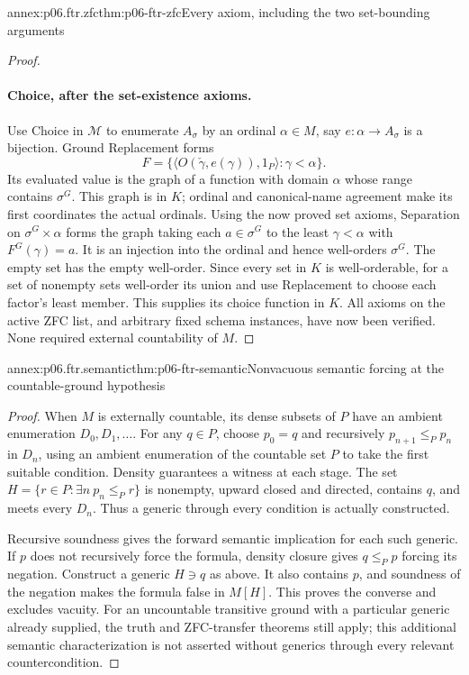 \begin{annexitem}{annex:p06.ftr.zfc}{thm:p06-ftr-zfc}{Every axiom, including the two set-bounding arguments}
\begin{proof}
\paragraph{Choice, after the set-existence axioms.}
Use Choice in \(\mathcal M\) to enumerate \(A_\sigma\) by an ordinal
\(\alpha\in M\), say \(e:\alpha\to A_\sigma\) is a bijection.
Ground Replacement forms
\[
 F=\{\langle O(\check\gamma,e(\gamma)),1_P\rangle:\gamma<\alpha\}.
\]
Its evaluated value is the graph of a function with domain \(\alpha\)
whose range contains \(\sigma^G\). This graph is in \(K\); ordinal
and canonical-name agreement make its first coordinates the actual ordinals.
Using the now proved set axioms, Separation on \(\sigma^G\times\alpha\)
forms the graph taking each \(a\in\sigma^G\) to the least
\(\gamma<\alpha\) with \(F^G(\gamma)=a\). It is an injection into
the ordinal and hence well-orders \(\sigma^G\). The empty set has the
empty well-order. Since every set in \(K\) is well-orderable, for a set
of nonempty sets well-order its union and use Replacement to choose each
factor's least member. This supplies its choice function in \(K\).
All axioms on the active ZFC list, and arbitrary fixed schema instances,
have now been verified. None required external countability of \(M\).
\end{proof}
\end{annexitem}

\begin{annexitem}{annex:p06.ftr.semantic}{thm:p06-ftr-semantic}{Nonvacuous semantic forcing at the countable-ground hypothesis}
\begin{proof}
When \(M\) is externally countable, its dense subsets of \(P\) have
an ambient enumeration \(D_0,D_1,\ldots\). For any \(q\in P\), choose
\(p_0=q\) and recursively \(p_{n+1}\leq_P p_n\) in \(D_n\),
using an ambient enumeration of the countable set \(P\) to take the
first suitable condition. Density guarantees a witness at each stage.
The set \(H=\{r\in P:\exists n\ p_n\leq_P r\}\) is nonempty,
upward closed and directed, contains \(q\), and meets every \(D_n\).
Thus a generic through every condition is actually constructed.

Recursive soundness gives the forward semantic implication for each such
generic. If \(p\) does not recursively force the formula, density closure
gives \(q\leq_P p\) forcing its negation. Construct a generic \(H\ni q\)
as above. It also contains \(p\), and soundness of the negation makes
the formula false in \(M[H]\). This proves the converse and excludes
vacuity. For an uncountable transitive ground with a particular generic
already supplied, the truth and ZFC-transfer theorems still apply; this
additional semantic characterization is not asserted without generics
through every relevant countercondition.
\end{proof}
\end{annexitem}
